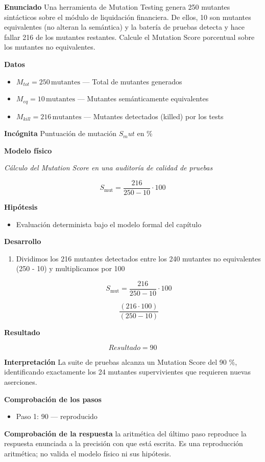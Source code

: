 \documentclass{book}
\begin{document}
\begin{tcolorbox}[title={Problema resuelto}, studiumworked, breakable]

\noindent\textbf{Enunciado}
Una herramienta de Mutation Testing genera 250 mutantes sintácticos sobre el módulo de liquidación financiera. De ellos, 10 son mutantes equivalentes (no alteran la semántica) y la batería de pruebas detecta y hace fallar 216 de los mutantes restantes. Calcule el Mutation Score porcentual sobre los mutantes no equivalentes.

\noindent\textbf{Datos}
\begin{itemize}
\item $M_{tot} = 250\,\mathrm{mutantes}$ — Total de mutantes generados
\item $M_{eq} = 10\,\mathrm{mutantes}$ — Mutantes semánticamente equivalentes
\item $M_{kill} = 216\,\mathrm{mutantes}$ — Mutantes detectados (killed) por los tests
\end{itemize}

\noindent\textbf{Incógnita}
Puntuación de mutación \(S_mut\) en \%

\noindent\textbf{Modelo físico}

\noindent\textit{Cálculo del Mutation Score en una auditoría de calidad de pruebas}

\[
S_{\text{mut}} = \frac{216}{250 - 10} \cdot 100
\]

\noindent\textbf{Hipótesis}
\begin{itemize}
\item Evaluación determinista bajo el modelo formal del capítulo
\end{itemize}

\noindent\textbf{Desarrollo}
\begin{enumerate}
\item
Dividimos los 216 mutantes detectados entre los 240 mutantes no equivalentes (250 - 10) y multiplicamos por 100

\[
S_{\text{mut}} = \frac{216}{250 - 10} \cdot 100
\]

\[
\frac{\left(216\cdot 100\right)}{\left(250-10\right)}
\]
\end{enumerate}

\noindent\textbf{Resultado}

\[
Resultado = 90
\]

\noindent\textbf{Interpretación}
La suite de pruebas alcanza un Mutation Score del 90 \%, identificando exactamente los 24 mutantes supervivientes que requieren nuevas aserciones.

\noindent\textbf{Comprobación de los pasos}
\begin{itemize}
\item Paso 1: $90$ — reproducido
\end{itemize}

\noindent\textbf{Comprobación de la respuesta} la aritmética del último paso reproduce la respuesta enunciada a la precisión con que está escrita. Es una reproducción aritmética; no valida el modelo físico ni sus hipótesis.
\end{tcolorbox}
\end{document}
